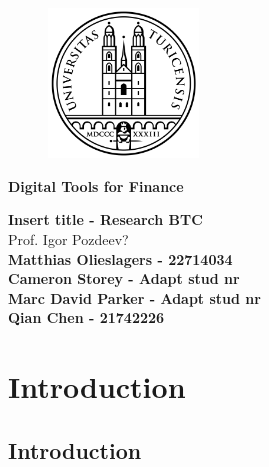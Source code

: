 \documentclass[12pt]{article}
\begin{document}
\pagestyle{empty}

\bigskip

\begin{figure}[htp]
    \centering
    \includegraphics[width=4cm]{uzh logo 2.png}
    \label{fig:UZH}
\end{figure}

\begin{Large}
	\begin{center}
		\textbf{Digital Tools for Finance}
	\end{center}
\end{Large}

\vspace{2cm}

\begin{large}	
	\begin{center}
		\textbf{Insert title - Research BTC} \vspace{0.1cm} \\ {Prof. Igor Pozdeev? } \vspace{2cm} \\ \textbf{Matthias Olieslagers - 22714034}  \\ \textbf{Cameron Storey - Adapt stud nr} \\ 
        \textbf{Marc David Parker - Adapt stud nr}\\
        \textbf{Qian Chen - 21742226}\\
	\end{center}
\end{large}

\tableofcontents

\newpage

\bigskip
\section{Introduction}

\subsection*{Introduction}
\end{document}
